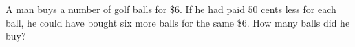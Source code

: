 A man buys a number of golf balls for \$6. If he had paid $50$ cents less for each ball, he could have bought six more balls for the same \$6. How many balls did he buy?
